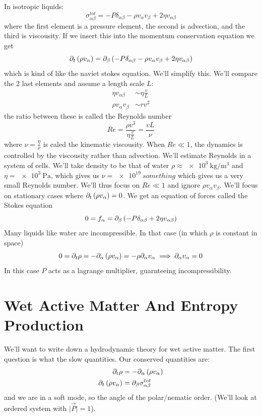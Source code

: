 In isotropic liquids:
\begin{equation}
    \sigma_{\alpha\beta}^{tot} = -P\delta_{\alpha\beta}-\rho v_\alpha v_\beta+2\eta v_{\alpha\beta}
\end{equation}
where the first element is a pressure element, the second is advection, and the third is viscousity. If we insert this into the momentum conservation equation we get 
\begin{equation}
    \partial_t \left(\rho v_\alpha\right) = \partial_\beta \left(-P\delta_{\alpha\beta}-\rho v_\alpha v_\beta + 2\eta v_{\alpha\beta}\right)
\end{equation}
which is kind of like the naviet stokes equation. We'll simplify this. We'll compare the 2 last elements and assume a length scale \(L\):
\begin{align}
    \eta v_{\alpha\beta} &\sim \eta \frac{v}{L} \\
    \rho v_\alpha v_\beta &\sim r v^2
\end{align}
the ratio between these is called the Reynolds number
\begin{equation}
    Re = \frac{\rho v^3}{\eta\frac{v}{L}} = \frac{vL}{\nu}
\end{equation}
where \(\nu = \frac{\eta}{\rho}\) is caled the kinematic viscousity. When \(Re \ll 1\), the dynamics is controlled by the viscousity rather than advection. We'll estimate Reynolds in a system of cells. We'll take density to be that of water \(\rho \approx \qty{e3}{\kilo\gram\per\meter^3}\) and \(\eta = \qty{e3}{\pascal}\), which gives us \(\nu = \qty{e19}{something}\) which gives us a very small Reynolds number. We'll thus focus on \(Re\ll 1\) and ignore \(\rho v_\alpha v_\beta\). We'll focus on stationary cases where \(\partial_t\left(\rho v_\alpha\right)=0\). We get an equation of forces called the Stokes equation
\begin{equation}
    0 = f_\alpha = \partial_\beta\left(-P\delta_{\alpha\beta}+2\eta v_{\alpha\beta}\right)
\end{equation}
Many liquids like water are incompressible. In that case (in which \(\rho\) is constant in space)
\begin{equation}
    0 = \partial_t\rho = -\partial_\alpha\left(\rho v_\alpha\right) = -\rho\partial_\alpha v_\alpha \implies \partial_\alpha v_\alpha =0
\end{equation}
In this case \(P\) acts as a lagrange multiplier, guarnteeing incompressibility.
\section{Wet Active Matter And Entropy Production}
We'll want to write down a hydrodynamic theory for wet active matter. The first question is what the slow quantities. Our conserved quantities are:
\begin{align}
    \partial_t\rho &= -\partial_\alpha\left(\rho v_\alpha\right) \\
    \partial_t\left(\rho v_\alpha\right) &= \partial_\beta\sigma_{\alpha\beta}^{tot}
\end{align}
and we are in a soft mode, so the angle of the polar/nematic order. (We'll look at ordered system with \(\vert \vec{P}\vert = 1\)).
